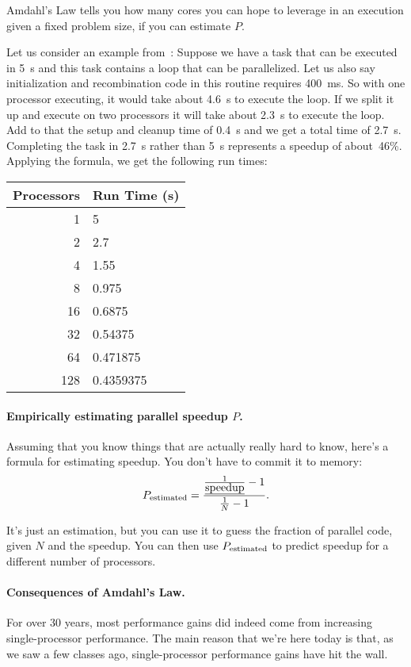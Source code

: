 Amdahl's Law tells you how many cores you can hope to leverage in an
execution given a fixed problem size, if you can estimate $P$.

Let us consider an example from~\cite{mte241}: Suppose we have a task that can be executed in 5~s and this task contains a loop that can be parallelized. Let us also say initialization and recombination code in this routine requires 400~ms. So with one processor executing, it would take about 4.6~s to execute the loop. If we split it up and execute on two processors it will take about 2.3~s to execute the loop. Add to that the setup and cleanup time of 0.4~s and we get a total time of 2.7~s. Completing the task in 2.7~s rather than 5~s represents a speedup of about~46\%. Applying the formula, we get the following run times:

\begin{center}
	\begin{tabular}{r|l}
	\textbf{Processors} & \textbf{Run Time (s)} \\ \hline
	1 & 5\\
	2 & 2.7\\
	4 & 1.55\\
	8 & 0.975\\
	16 & 0.6875 \\
	32 & 0.54375 \\
	64 & 0.471875 \\
	128 & 0.4359375\\
	\end{tabular}
\end{center}

   \paragraph{Empirically estimating parallel speedup $P$.}
Assuming that you know things that are actually really hard to know, here's a formula for estimating speedup. You don't have to commit it to memory:
  \[P_{\mbox{\scriptsize estimated}} = \frac{\frac{1}{\mbox{\em speedup}}-1}{\frac{1}{N}-1}.\]

It's just an estimation, but you can use it to guess the fraction of parallel code, given $N$ and the speedup. You can then use $P_{\mbox{\scriptsize estimated}}$ to predict speedup for a different number of processors.

\paragraph{Consequences of Amdahl's Law.}
For over 30 years, most performance gains did indeed come from
increasing single-processor performance. The main reason that we're
here today is that, as we saw a few classes ago,
single-processor performance gains have hit the wall.

